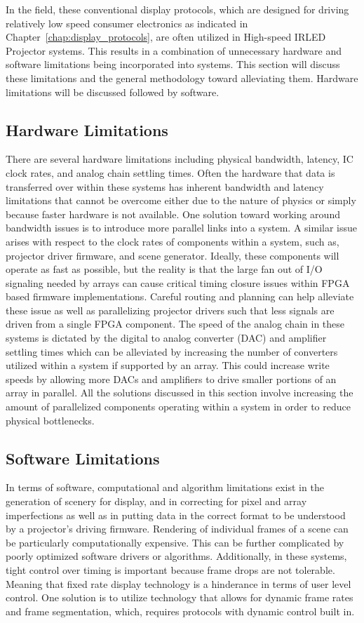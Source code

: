     In the field, these conventional display protocols, which are designed for driving relatively low speed consumer electronics as indicated in Chapter~\ref{chap:display_protocols}, are often utilized in High-speed IRLED Projector systems. This results in a combination of unnecessary hardware and software limitations being incorporated into systems. This section will discuss these limitations and the general methodology toward alleviating them. Hardware limitations will be discussed followed by software.

    \subsection{Hardware Limitations}
        There are several hardware limitations including physical bandwidth, latency, IC clock rates, and analog chain settling times. Often the hardware that data is transferred over within these systems has inherent bandwidth and latency limitations that cannot be overcome either due to the nature of physics or simply because faster hardware is not available. One solution toward working around bandwidth issues is to introduce more parallel links into a system. A similar issue arises with respect to the clock rates of components within a system, such as, projector driver firmware, and scene generator. Ideally, these components will operate as fast as possible, but the reality is that the large fan out of I/O signaling needed by arrays can cause critical timing closure issues within FPGA based firmware implementations. Careful routing and planning can help alleviate these issue as well as parallelizing projector drivers such that less signals are driven from a single FPGA component. The speed of the analog chain in these systems is dictated by the digital to analog converter (DAC) and amplifier settling times which can be alleviated by increasing the number of converters utilized within a system if supported by an array. This could increase write speeds by allowing more DACs and amplifiers to drive smaller portions of an array in parallel. All the solutions discussed in this section involve increasing the amount of parallelized components operating within a system in order to reduce physical bottlenecks.

    \subsection{Software Limitations}
        In terms of software, computational and algorithm limitations exist in the generation of scenery for display, and in correcting for pixel and array imperfections as well as in putting data in the correct format to be understood by a projector's driving firmware. Rendering of individual frames of a scene can be particularly computationally expensive. This can be further complicated by poorly optimized software drivers or algorithms. Additionally, in these systems, tight control over timing is important because frame drops are not tolerable. Meaning that fixed rate display technology is a hinderance in terms of user level control. One solution is to utilize technology that allows for dynamic frame rates and frame segmentation, which, requires protocols with dynamic control built in.


